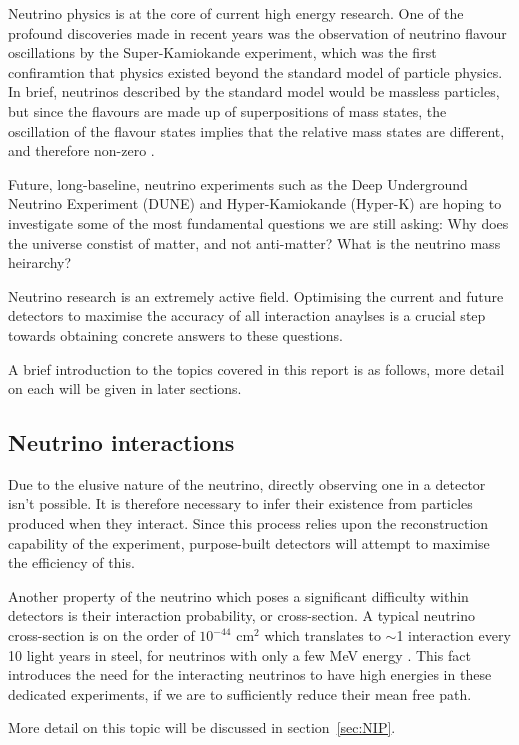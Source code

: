 Neutrino physics is at the core of current high energy research. One of the profound discoveries made in recent years was the observation of neutrino flavour oscillations by the Super-Kamiokande experiment, which was the first confiramtion that physics existed beyond the standard model of particle physics. In brief, neutrinos described by the standard model would be massless particles, but since the flavours are made up of superpositions of mass states, the oscillation of
the flavour states implies that the relative mass states are different, and therefore non-zero \cite{nuInt}.

    Future, long-baseline,  neutrino experiments such as the Deep Underground Neutrino Experiment (DUNE) and Hyper-Kamiokande (Hyper-K) are hoping to investigate some of the most fundamental questions we are still asking: Why does the universe constist of matter, and not anti-matter? What is the neutrino mass heirarchy?

    Neutrino research is an extremely active field. Optimising the current and future detectors to maximise the accuracy of all interaction anaylses is a crucial step towards obtaining concrete answers to these questions. 

    A brief introduction to the topics covered in this report is as follows, more detail on each will be given in later sections. 

\subsection{Neutrino interactions}

Due to the elusive nature of the neutrino, directly observing one in a detector isn't possible. It is therefore necessary to infer their existence from particles produced when they interact. Since this process relies upon the reconstruction capability of the experiment, purpose-built detectors will attempt to maximise the efficiency of this.

Another property of the neutrino which poses a significant difficulty within detectors is their interaction probability, or cross-section. A typical neutrino cross-section is on the order of $ 10^{-44} $ cm$^{2}$ which translates to $\sim$1 interaction every 10 light years in steel, for neutrinos with only a few MeV energy \cite{nuOsc}. This fact introduces the need for the interacting neutrinos to have high energies in these dedicated experiments, if we are to sufficiently reduce their mean free path.

More detail on this topic will be discussed in section~\ref{sec:NIP}.

